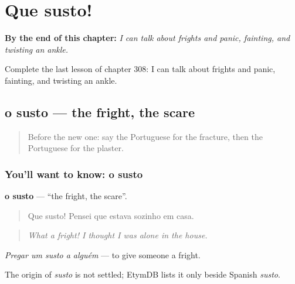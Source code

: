 
\chapter{Que susto!}
\label{ch:pt-que-susto}

\begin{chapteropening}
\textbf{By the end of this chapter:} \emph{I can talk about frights and panic, fainting, and twisting an ankle.}

Complete the last lesson of chapter 308: I can talk about frights and panic, fainting, and twisting an ankle.
\end{chapteropening}

\section[o susto]{o susto — the fright, the scare}

\label{lesson:PT-C308-susto}



\begin{quote}
Before the new one: say the Portuguese for the fracture, then the Portuguese for the plaster.
\end{quote}

\subsection*{You'll want to know: o susto}
\textbf{o susto} — \textquotedblleft{}the fright, the scare\textquotedblright{}.

\begin{quote}
Que susto! Pensei que estava sozinho em casa.
\end{quote}

\begin{quote}
\emph{What a fright! I thought I was alone in the house.}
\end{quote}

\emph{Pregar um susto a alguém} — to give someone a fright.

\begin{cousinweb}
The origin of \emph{susto} is not settled; EtymDB lists it only beside Spanish \emph{susto}.
\end{cousinweb}

